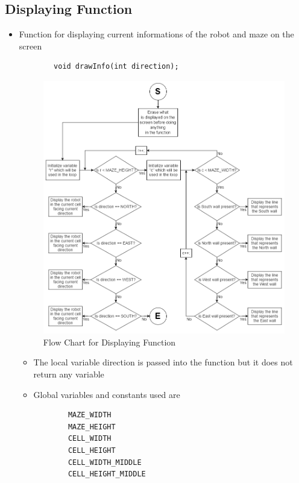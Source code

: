 \documentclass[11pt]{article}
\begin{document}
\subsection{Displaying Function}
\begin{itemize}
\item Function for displaying current informations of the robot and maze on the screen
	\begin{verbatim}
		void drawInfo(int direction);
	\end{verbatim}
\begin{figure}[htp]
\centering
\includegraphics[scale=0.516]{images/Software_Flowchart/Drawing_Function.png}
\caption{Flow Chart for Displaying Function}
\label{}
\end{figure}
	\begin{itemize}
	\item The local variable direction is passed into the function but it does not return any variable
	\item Global variables and constants used are
	\begin{verbatim}
		MAZE_WIDTH
		MAZE_HEIGHT
		CELL_WIDTH
		CELL_HEIGHT
		CELL_WIDTH_MIDDLE
		CELL_HEIGHT_MIDDLE
	\end{verbatim}
	\end{itemize}
\end{itemize}
\newpage
\end{document}
